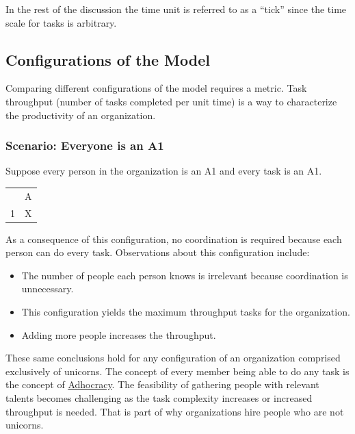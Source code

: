In the rest of the discussion the time unit is referred to as a ``tick'' since the time scale for tasks is arbitrary.

\subsection*{Configurations of the Model}



Comparing different configurations of the model requires a metric. 
Task throughput (number of tasks completed per unit time) is a way to characterize the productivity of an organization. 


\subsubsection*{Scenario: Everyone is an A1}

Suppose every person in the organization is an A1 and every task is an A1.

\begin{center}
\begin{tabular}{c|c|}
  & A \\
\cline{2-2}
1 & X \\
\cline{2-2}
\end{tabular}
\end{center}

As a consequence of this configuration, no coordination is required because each person can do every task. Observations about this configuration include:
\begin{itemize}
    \item The number of people each person knows is irrelevant because coordination is unnecessary.
    \item This configuration yields the maximum throughput tasks for the organization.
    \item Adding more people increases the throughput.
\end{itemize}

These same conclusions hold for any configuration of an organization comprised exclusively of unicorns. 
The concept of every member being able to do any task is the concept of 
\href{https://en.wikipedia.org/wiki/Adhocracy}{Adhocracy}.%
The feasibility of gathering people with relevant talents becomes challenging as the task complexity increases or increased throughput is needed. That is part of why organizations hire people who are not unicorns. 

